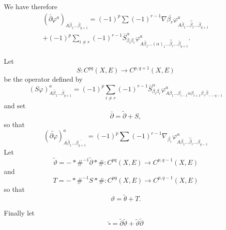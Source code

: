 We have therefore
\begin{multline*}
  (\bar{\partial}\varphi^a)_{A  \bar{\beta}_1\ldots \bar{\beta}_{q+1}}=
  (-1)^p\sum (-1)^{r-1}\nabla\bar{\beta_r}
  \varphi^a_{A\bar{\beta}_1\ldots \hat{\bar{\beta}}_r \ldots
  \bar{\beta}_{q+1}}\\  
  +(-1)^p \sum\limits_{i\neq r
  }(-1)^{r-1}\bar{S}^\alpha_{\beta_i\beta_r} 
\varphi^a_{A\bar{\beta}_1\ldots(\alpha)_1\ldots \hat{\bar{\beta}}_r\ldots
  \bar{\beta}_{q+1}}. 
\end{multline*}

Let\pageoriginale
$$ 
S: C^{pq}(X,E)\rightarrow C^{p,q+1}(X,E)
$$
be the operator defined by 
\begin{equation*}
  (S\varphi)^a_{A \bar{\beta}_1\ldots
  \bar{\beta}_{q+1}} = (-1)^p \sum\limits_{i \neq r} 
(-1)^{r-1}\bar{S}^\alpha_{\beta _i \beta_r}
\varphi^a_{A\beta_1 \ldots \beta_{i-1} \alpha \beta_{i+1}\beta _\gamma
  \bar{\beta}_{--q-1}} \tag{3.4}\label{eq3.4}
\end{equation*}
and set
\begin{equation*}
  \bar{\partial}=\tilde{\partial}+S, \tag{3.5}\label{eq3.5}
\end{equation*}
so that
\begin{equation*}
  (\tilde{\partial\varphi})^a_{A \bar{\beta}_1\ldots
    \bar{\beta_{q+1}}}=(-1)^p\sum
  (-1)^{r-1} \nabla_{\bar{\beta_r}} \varphi^\alpha_{A \bar{\beta_1}\ldots
    \hat{\bar{\beta}}_r\ldots \beta_{q-1}} \tag{3.6}\label{eq3.6}
\end{equation*}
Let
\begin{equation*}
  \tilde{\vartheta}=-*\#^{-1}\tilde{\partial} * \#: 
  C^{pq}(X,E)\rightarrow C^{p,q-1}(X,E) \tag{3.7}\label{eq3.7}
\end{equation*}
and 
\begin{equation*}
  T=-*\#^{-1}  S * \# : C^{pq}(X,E)\rightarrow C^{p,q-1}(X,E)
  \tag{3.8}\label{eq3.8} 
\end{equation*}
so that
\begin{equation*}
  \vartheta = \tilde{\theta}+ T. \tag{3.9}\label{eq3.9}
\end{equation*}

Finally let  
\begin{equation*}  
  \tilde{\square} = \tilde{\partial}\tilde{\vartheta} +
  \tilde{\vartheta}\tilde{\partial}  
\end{equation*}

